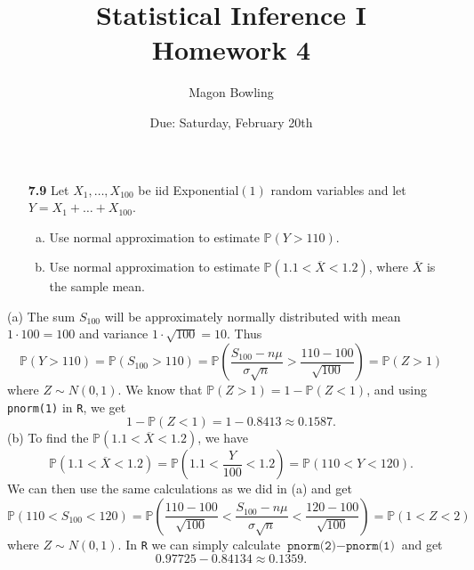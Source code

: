 \documentclass[11pt]{article}
\theoremstyle{definition}
\renewcommand{\P}{\mathbb{P}}
\newcommand{\1}[1]{\mathbf{1} \left \{ #1 \right \}}
\begin{document}
\title{Statistical Inference I \\ Homework 4}
\date{Due: Saturday, February 20th}
\author{Magon Bowling}

\maketitle

\begin{itemize}
\item [{\color{red} \textbf{7.9}}] Let $X_1, \ldots, X_{100}$ be iid Exponential$(1)$ random variables and let $Y = X_1 + \ldots + X_{100}$.
\begin{enumerate}[(a)]
\item Use normal approximation to estimate $\P(Y > 110)$.
\item Use normal approximation to estimate $\P(1.1 < \overline{X} < 1.2)$, where $\overline{X}$ is the sample mean.
\end{enumerate}
\end{itemize}
(a) The sum $S_{100}$ will be approximately normally distributed with mean $1 \cdot 100 = 100$ and variance $1 \cdot \sqrt{100} = 10$.  Thus
\[\P(Y > 110) = \P(S_{100} > 110) = \P\left(\frac{S_{100} - n\mu}{\sigma \sqrt{n}} > \frac{110 - 100}{\sqrt{100}}\right) = \P(Z > 1)\]
where $Z \sim N(0,1)$.  We know that $\P(Z > 1) = 1 - \P(Z < 1)$, and using \texttt{pnorm(1)} in \texttt{R}, we get
\[1 - \P(Z < 1) = 1 - 0.8413 \approx 0.1587.\]
(b) To find the $\P(1.1 < \overline{X} < 1.2)$, we have
\[\P(1.1 < \overline{X} < 1.2) = \P\left(1.1 < \frac{Y}{100} < 1.2\right) = \P(110 < Y < 120).\]
We can then use the same calculations as we did in (a) and get
\[\P(110 < S_{100} < 120) = \P\left(\frac{110 - 100}{\sqrt{100}} < \frac{S_{100} - n\mu}{\sigma \sqrt{n}} < \frac{120 - 100}{\sqrt{100}}\right) = \P(1 < Z < 2)\]
where $Z \sim N(0,1)$.  In \texttt{R} we can simply calculate $\texttt{pnorm(2)} - \texttt{pnorm(1)}$ and get
\[0.97725 - 0.84134 \approx 0.1359.\]
\end{document}
